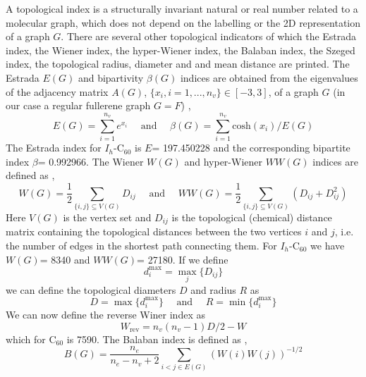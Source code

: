 \documentclass[article,a4paper,twoside]{memoir}
\newcommand{\C}[1]{\ensuremath{\mathrm{C}_{#1}}}
\begin{document}
A topological index is a structurally invariant natural or real number related to a molecular graph, which does not depend on the labelling 
or the 2D representation of a graph $G$. There are several other topological indicators \cite{Cataldo,Caporossi} of which the Estrada 
index, the Wiener index, the hyper-Wiener index, the Balaban index, the Szeged index, the topological radius, diameter and and mean distance
are printed. The Estrada $E(G)$ and bipartivity $\beta(G)$ indices are obtained from the eigenvalues of the adjacency
matrix $A(G)$, $\{ x_i, i=1,...,n_v \} \in [-3,3]$, of a graph $G$ (in our case a regular fullerene graph $G=F$) \cite{Estrada,Doslic2005},
\begin{equation}
  \label{Estrada}
  E(G)=\sum_{i=1}^{n_v}e^{x_i} \quad \text{ and } \quad \beta(G)=\sum_{i=1}^{n_v}\text{cosh}(x_i)/E(G)
\end{equation}
The Estrada index for $I_h$-\C{60} is $E$= 197.450228 and the corresponding bipartite index $\beta$= 0.992966. The Wiener $W(G)$ and hyper-Wiener $WW(G)$ 
indices are defined as \cite{Wiener1947},
\begin{equation}
  \label{Wiener}
  W(G)=\frac{1}{2} \sum_{\{ i,j \} \subseteq V(G)} D_{ij} \quad \text{ and } \quad WW(G)=\frac{1}{2} \sum_{\{ i,j \} \subseteq V(G)} \left( D_{ij} + D_{ij}^2 \right)
\end{equation}
Here $V(G)$ is the vertex set and $D_{ij}$ is the topological (chemical) distance matrix containing the topological distances 
between the two vertices $i$ and $j$, i.e. the number of edges in the shortest path connecting them. 
For $I_h$-\C{60} we have $W(G)$= 8340 and $WW(G)$= 27180. If we define
\begin{equation}
  \label{TopDist}
  d_i^{\mathrm{max}} = \max\limits_{j} \{ D_{ij} \}
\end{equation}
we can define the topological diameters $D$ and radius $R$ as\cite{Caporossi}
\begin{equation}
  \label{TopDist}
  D = \max \{ d_i^{\mathrm{max}} \} \quad \text{ and } \quad  R = \min \{ d_i^{\mathrm{max}} \}
\end{equation}
We can now define the reverse Winer index\cite{Balaban2000} as
\begin{equation}
  \label{RevWiener}
  W_{\mathrm{rev}} = n_v(n_v - 1)D/2 - W
\end{equation}
which for \C{60} is 7590. The Balaban index is defined as \cite{Balaban},
\begin{equation}
  \label{Balaban}
  B(G)=\frac{n_e}{n_e-n_v+2} \sum_{i<j \in E(G)} \left( W(i)W(j) \right)^{-1/2}
\end{equation}
\end{document}
